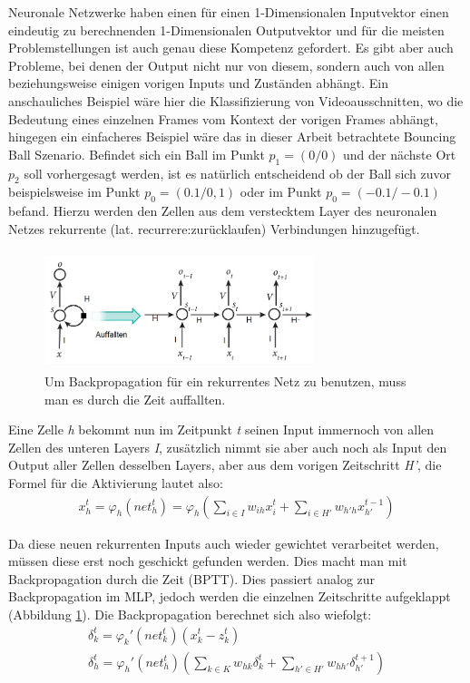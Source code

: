 Neuronale Netzwerke haben einen für einen 1-Dimensionalen Inputvektor einen eindeutig zu berechnenden 1-Dimensionalen Outputvektor und für die meisten Problemstellungen ist auch genau diese Kompetenz gefordert. Es gibt aber auch Probleme, bei denen der Output nicht nur von diesem, sondern auch von allen beziehungsweise einigen vorigen Inputs und Zuständen abhängt. Ein anschauliches Beispiel wäre hier die Klassifizierung von Videoausschnitten, wo die Bedeutung eines einzelnen Frames vom Kontext der vorigen Frames abhängt, hingegen ein einfacheres Beispiel wäre das in dieser Arbeit betrachtete Bouncing Ball Szenario. Befindet sich ein Ball im Punkt \(p_{1}=(0/0)\) und der nächste Ort \(p_{2}\) soll vorhergesagt werden, ist es natürlich entscheidend ob der Ball sich zuvor beispielsweise im Punkt \(p_{0}=(0.1/0,1)\) oder im Punkt \(p_{0}=(-0.1/-0.1)\) befand. Hierzu werden den Zellen aus dem verstecktem Layer des neuronalen Netzes rekurrente (lat. recurrere:zurücklaufen) Verbindungen hinzugefügt.
\begin{figure}
	\centering
	\includegraphics[width=0.7\textwidth, height=130px]{pics/rnn.jpg}	
	\caption{Um Backpropagation für ein rekurrentes Netz zu benutzen, muss man es durch die Zeit auffallten. \cite{bib:rnn}}
	\label{img:rnn}
\end{figure}
Eine Zelle \textit{h} bekommt nun im Zeitpunkt \textit{t} seinen Input immernoch von allen Zellen des unteren Layers \textit{I}, zusätzlich nimmt sie aber auch noch als Input den Output aller Zellen desselben Layers, aber aus dem vorigen Zeitschritt \textit{H'}, die Formel für die Aktivierung lautet also: 
\begin{gather}
x^{t}_{h}=\varphi_{h}(net_{h}^{t})=\varphi_{h}(\sum_{i \in I}w_{ih}x^{t}_{i}+\sum_{i \in H'}w_{h'h}x^{t-1}_{h'})
\end{gather}

Da diese neuen rekurrenten Inputs auch wieder gewichtet verarbeitet werden, müssen diese erst noch geschickt gefunden werden. Dies macht man mit Backpropagation durch die Zeit (BPTT). Dies passiert analog zur Backpropagation im MLP, jedoch werden die einzelnen Zeitschritte aufgeklappt (Abbildung \ref{img:rnn}). Die Backpropagation berechnet sich also wiefolgt:
\begin{gather}
	\delta_{k}^{t} = \varphi_{k}'(net_{k}^{t})(x_{k}^{t}-z^{t}_{k}) \\
	\delta_{h}^{t} = \varphi_{h}'(net_{h}^{t})(\sum_{k \in K}w_{hk}\delta^{t}_{k}+\sum_{h' \in H'}w_{hh'}\delta^{t+1}_{h'})
\end{gather}

